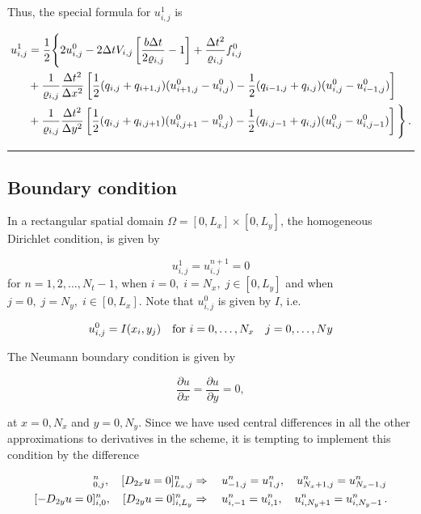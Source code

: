 \documentclass[letterpaper,10pt,english]{/usr/share/sphinx/texinputs/sphinxhowto}
\begin{document}
Thus, the special formula for $u^1_{i,j}$ is

\begin{align*}
u^{1}_{i,j} &= 
\frac{1}{2}\Bigg\{
2u^{0}_{i,j}  -  2\Delta t V_{i,j} \left[\frac{b \Delta t}{2\varrho_{i,j}} - 1\right]+\frac{\Delta t^2}{\varrho_{i,j}} f^0_{i,j} \\
&+ \frac{1}{\varrho_{i,j}}\frac{\Delta t^2}{\Delta x^2} 
\left[ \frac{1}{2}(q_{i,j} + q_{i+1,j})(u^{0}_{i+1,j} - u^{0}_{i,j}) - \frac{1}{2}(q_{i-1,j} + q_{i,j})(u^{0}_{i,j} - u^{0}_{i-1,j})\right] \\
&+ \frac{1}{\varrho_{i,j}}\frac{\Delta t^2}{\Delta y^2} 
\left[ \frac{1}{2}(q_{i,j} + q_{i,j+1})(u^{0}_{i,j+1} - u^{0}_{i,j}) -\frac{1}{2}(q_{i,j-1} + q_{i,j})(u^{0}_{i,j} - u^{0}_{i,j-1})\right]
\Bigg\}
\thinspace .\end{align*}\begin{center}\rule{3in}{0.4pt}\end{center}

\subsection{Boundary condition}

In a rectangular spatial domain $\Omega = [0,L_x]\times [0,L_y]$, the
homogeneous Dirichlet condition, is given by

\[
u_{i,j}^{1} = u_{i,j}^{n+1} = 0 
\] for $n=1,2,\ldots,N_t-1$, when $i=0, \; i=N_x,\; j \in [0,L_y]$ and
when $j=0,\; j=N_y,\; i \in [0,L_x]$. Note that $u_{i,j}^{0}$ is given
by $I$, i.e.

\[
u_{i,j}^{0} = I(x_i,y_j) \quad \hbox{for   } i=0,\ldots,N_x \quad j=0,\ldots,Ny
\]

The Neumann boundary condition is given by

\begin{equation}
 \frac{\partial u}{\partial x}= \frac{\partial u}{\partial y} = 0,
\end{equation}

at $x = 0, N_x$ and $y = 0, N_y$. Since we have used central differences
in all the other approximations to derivatives in the scheme, it is
tempting to implement this condition by the difference

\begin{align*}
[-D_{2x} u = 0]^n_{0,j},\quad[D_{2x} u = 0]^n_{L_x,j}
&\Rightarrow\quad u^n_{-1,j}=u^n_{1,j}, \quad u^n_{N_x+1,j}=u^n_{N_x-1,j} \\
[-D_{2y} u = 0]^n_{i,0},\quad[D_{2y} u = 0]^n_{i,L_y}
&\Rightarrow\quad u^n_{i,-1}=u^n_{i,1}, \quad u^n_{i,N_y+1}=u^n_{i,N_y-1}
\thinspace .
\end{align*}
\end{document}
